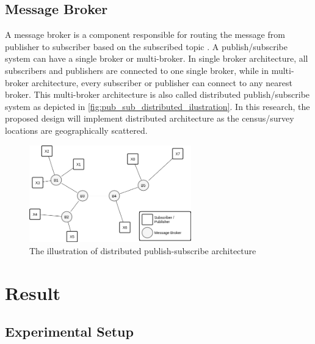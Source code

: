 \documentclass[conference]{IEEEtran}
\begin{document}
\subsection{Message Broker}
\label{ssec:message-broker}
A message broker is a component responsible for routing the message from publisher to subscriber based on the subscribed topic \cite{banavar_efficient_1999}. A publish/subscribe system can have a single broker or multi-broker. In single broker architecture, all subscribers and publishers are connected to one single broker, while in multi-broker architecture, every subscriber or publisher can connect to any nearest broker. This multi-broker architecture is also called distributed publish/subscribe system \cite{muhl_large-scale_2002} as depicted in \autoref{fig:pub_sub_distributed_ilustration}. In this research, the proposed design will implement distributed architecture as the census/survey locations are geographically scattered. 


\begin{figure}[!]
	\centering
	\includegraphics[width=7cm]{Resources/Images/pub_sub_distributed_ilustration}
	\caption{The illustration of distributed publish-subscribe architecture}
	\label{fig:pub_sub_distributed_ilustration}
\end{figure}


\section{Result}
\label{sec:testing}

\subsection{Experimental Setup}
\label{ssec:experimental-setup}
\end{document}
